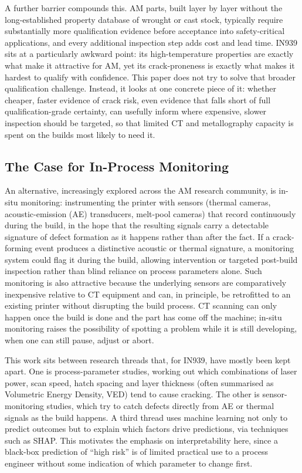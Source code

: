 \documentclass[a4paper]{article}
\begin{document}
A further barrier compounds this. AM parts, built layer by layer without the long-established property database of wrought or cast stock, typically require substantially more qualification evidence before acceptance into safety-critical applications, and every additional inspection step adds cost and lead time. IN939 sits at a particularly awkward point: its high-temperature properties are exactly what make it attractive for AM, yet its crack-proneness is exactly what makes it hardest to qualify with confidence. This paper does not try to solve that broader qualification challenge. Instead, it looks at one concrete piece of it: whether cheaper, faster evidence of crack risk, even evidence that falls short of full qualification-grade certainty, can usefully inform where expensive, slower inspection should be targeted, so that limited CT and metallography capacity is spent on the builds most likely to need it.

\subsection{The Case for In-Process Monitoring}
An alternative, increasingly explored across the AM research community, is in-situ monitoring: instrumenting the printer with sensors (thermal cameras, acoustic-emission (AE) transducers, melt-pool cameras) that record continuously during the build, in the hope that the resulting signals carry a detectable signature of defect formation as it happens rather than after the fact. If a crack-forming event produces a distinctive acoustic or thermal signature, a monitoring system could flag it during the build, allowing intervention or targeted post-build inspection rather than blind reliance on process parameters alone. Such monitoring is also attractive because the underlying sensors are comparatively inexpensive relative to CT equipment and can, in principle, be retrofitted to an existing printer without disrupting the build process. CT scanning can only happen once the build is done and the part has come off the machine; in-situ monitoring raises the possibility of spotting a problem while it is still developing, when one can still pause, adjust or abort.

This work sits between research threads that, for IN939, have mostly been kept apart. One is process-parameter studies, working out which combinations of laser power, scan speed, hatch spacing and layer thickness (often summarised as Volumetric Energy Density, VED) tend to cause cracking. The other is sensor-monitoring studies, which try to catch defects directly from AE or thermal signals as the build happens. A third thread uses machine learning not only to predict outcomes but to explain which factors drive predictions, via techniques such as SHAP. This motivates the emphasis on interpretability here, since a black-box prediction of ``high risk'' is of limited practical use to a process engineer without some indication of which parameter to change first.
\end{document}
